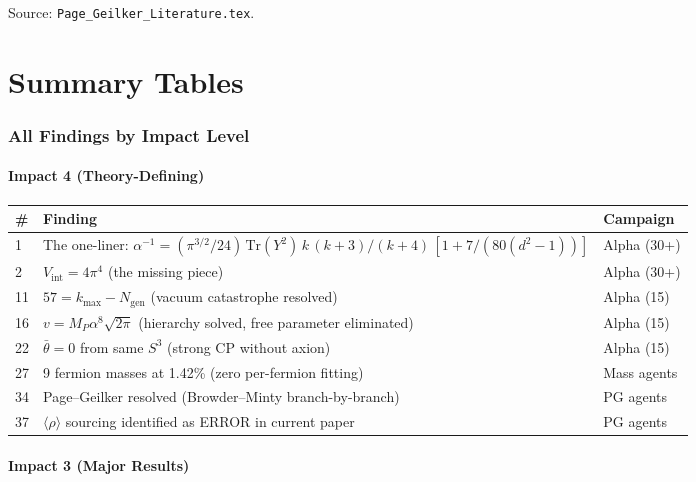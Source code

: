 \documentclass[11pt,a4paper]{article}
\newcommand{\Tr}{\mathrm{Tr}}
\begin{document}
Source: \texttt{Page\_Geilker\_Literature.tex}.


\part{Summary Tables}
\label{part:summary}


\section{All Findings by Impact Level}

\subsection{Impact 4 (Theory-Defining)}

\begin{longtable}{@{}p{0.7cm}p{12cm}l@{}}
\toprule
\# & Finding & Campaign \\
\midrule
1 & The one-liner: $\alpha^{-1} = (\pi^{3/2}/24)\,\Tr(Y^2)\,k\,(k{+}3)/(k{+}4)\,[1 + 7/(80(d^2{-}1))]$ & Alpha (30+) \\
2 & $V_{\mathrm{int}} = 4\pi^4$ (the missing piece) & Alpha (30+) \\
11 & $57 = k_{\max} - N_{\mathrm{gen}}$ (vacuum catastrophe resolved) & Alpha (15) \\
16 & $v = M_P\alpha^8\sqrt{2\pi}$ (hierarchy solved, free parameter eliminated) & Alpha (15) \\
22 & $\bar\theta = 0$ from same $S^3$ (strong CP without axion) & Alpha (15) \\
27 & 9 fermion masses at 1.42\% (zero per-fermion fitting) & Mass agents \\
34 & Page--Geilker resolved (Browder--Minty branch-by-branch) & PG agents \\
37 & $\langle\rho\rangle$ sourcing identified as ERROR in current paper & PG agents \\
\bottomrule
\end{longtable}


\subsection{Impact 3 (Major Results)}
\end{document}
